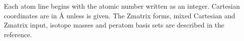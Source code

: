 \documentclass[letterpaper,10pt,english,openany,oneside]{sphinxmanual}
\begin{document}
\begin{sphinxVerbatim}[commandchars=\\\{\}]
\end{sphinxVerbatim}



\sphinxAtStartPar
Each atom line begins with the atomic number written as an integer. Cartesian coordinates are in Å unless  is
given. The Z\sphinxhyphen{}matrix forms, mixed Cartesian and Z\sphinxhyphen{}matrix input, isotope masses and per\sphinxhyphen{}atom basis sets are described
in the {\hyperref[\detokenize{reference/molecule:group-molecule}]{}} reference.
\end{document}
